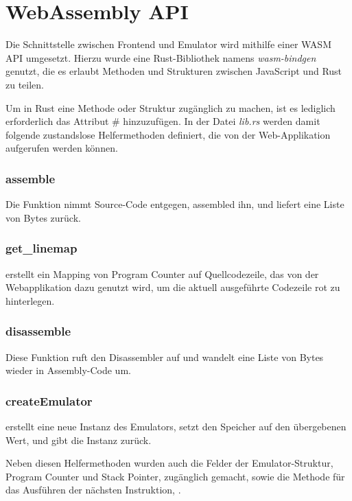 \section{WebAssembly API} \label{sec:wasmapi}

Die Schnittstelle zwischen Frontend und Emulator wird mithilfe einer \ac{WASM} \ac{API} umgesetzt. Hierzu wurde eine Rust-Bibliothek namens \textit{wasm-bindgen} genutzt, die es erlaubt Methoden und Strukturen zwischen JavaScript und Rust zu teilen.

Um in Rust eine Methode oder Struktur zugänglich zu machen, ist es lediglich erforderlich das Attribut \# hinzuzufügen.
In der Datei \textit{lib.rs} werden damit folgende zustandslose Helfermethoden definiert, die von der Web-Applikation aufgerufen werden können.

\subsubsection*{assemble}

Die Funktion  nimmt Source-Code entgegen, assembled ihn, und liefert eine Liste von Bytes zurück.

\subsubsection*{get_linemap}

 erstellt ein Mapping von Program Counter auf Quellcodezeile, das von der Webapplikation dazu genutzt wird, um die aktuell ausgeführte Codezeile rot zu hinterlegen.

\subsubsection*{disassemble}

Diese Funktion ruft den Disassembler auf und wandelt eine Liste von Bytes wieder in Assembly-Code um.

\subsubsection*{createEmulator}

 erstellt eine neue Instanz des Emulators, setzt den Speicher auf den übergebenen Wert, und gibt die Instanz zurück.

Neben diesen Helfermethoden wurden auch die Felder der Emulator-Struktur, Program Counter und Stack Pointer, zugänglich gemacht, sowie die Methode für das Ausführen der nächsten Instruktion, .

